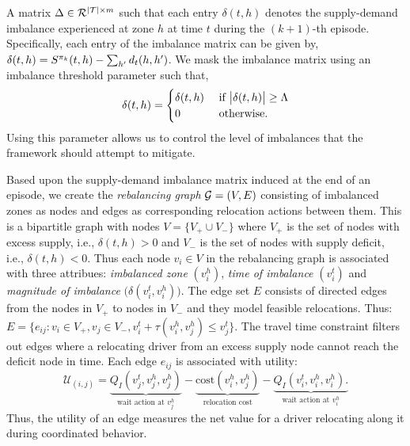 A matrix ${{{\Delta}}} \in {{\ensuremath{\mathcal{R}}}}^{|{{\mathcal{T}}}| \times
    m}$ such that each entry $\delta(t,h)$ denotes the supply-demand imbalance
    experienced at zone $h$ at time $t$ during the $(k+1)$-th episode. 
Specifically, each entry of the imbalance matrix can be given by, $\delta(t, h) =
    S^{{{\pi}}_k}(t, h) - \sum_{h'} d_t(h, h')$.
We mask the imbalance matrix using an imbalance threshold parameter 
    {\imbalancethreshold} such that,
    \begin{equation*}
        \delta(t,h) = 
            \begin{cases}
            \delta(t, h) &\text{ if } \big|\delta(t, h)\big|
            \geq {{\ensuremath{\Lambda}}} \\
            0 &\text{ otherwise. }
        \end{cases}
    \end{equation*}
Using this parameter allows us to control the level of imbalances that the
    framework should attempt to mitigate. 

Based upon the supply-demand imbalance matrix induced at the end of an
    episode, we create the \emph{rebalancing graph}
    ${{\mathcal{G}}} = (V,E)$ consisting of
    imbalanced zones as nodes and edges as corresponding relocation actions between
    them. %
This is a bipartitle graph with nodes 
$V = \big\{V_+ \cup V_-\big\}$ where $V_+$ is the set
    of nodes with excess supply, i.e., $\delta(t,h) > 0$ and $V_-$ is the
    set of nodes with supply deficit, i.e., $\delta(t, h) < 0$.
Thus each node $v_i \in V$ in the rebalancing graph is associated with 
    three attribues: \textit{imbalanced zone} $(v_i^h)$, \textit{time of
    imbalance} $(v_i^t)$ and \textit{magnitude of imbalance} $\big(\delta(v_i^t, v_i^h)\big)$.
The edge set $E$ consists of directed edges from the nodes in $V_+$ 
    to nodes in $V_-$ and they model feasible relocations. 
Thus:
    $E = \big\{ e_{ij}: v_i \in V_+, v_j \in V_-, v_i^t + \tau(v_i^h,v_j^h) \leq v_j^t\big\}$.
The travel time constraint filters out edges where a relocating driver from
    an excess supply node cannot reach the deficit node in time.
Each edge $e_{ij}$ is associated with utility:
    \begin{equation*}
        \mathcal{U}_{(i,j)} = \underbrace{Q_I(v_j^t, v_j^h ,v_j^h )}_\text{wait
        action at $v_j^h$} - \underbrace{\textrm{cost}(v_i^h,v_j^h)}_\text{relocation cost} -
    \underbrace{Q_I(v_i^t, v_i^h, v_i^h).}_\text{wait action at $v_i^h$}
    \end{equation*}
Thus, the utility of an edge measures the net value for a driver relocating along it
    during coordinated behavior.

